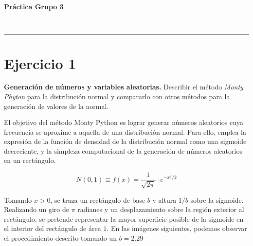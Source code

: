 \documentclass[a4paper,12pt]{article}
\begin{document}
	
	\setlength{\parindent}{0.5cm}
	\setlength{\voffset}{-2cm}
	\setlength{\hoffset}{-2cm}
	
	\begin{center}
		\begin{LARGE}
			\textbf{Práctica Grupo 3}
		\end{LARGE}
		\begin{Large}
			\\ \medskip {}
		\end{Large}
		\rule{14cm}{0.5mm}
	\end{center}
	
	
	\tableofcontents
	
\newpage
	\section*{Ejercicio 1}
	\textbf{Generación de números y variables aleatorias.} Describir el método \textit{Monty Phyton} para la distribución normal y compararlo con otros métodos para la
generación de valores de la normal.
	
	El objetivo del método Monty Python es lograr generar números aleatorios cuya frecuencia se aproxime a aquella de una distribución normal. Para ello, emplea la expresión de la función de densidad de la distribución normal como una sigmoide decreciente, y la simpleza computacional de la generación de números aleatorios en un rectángulo.
	
	$$ N(0,1) \equiv f(x) = \dfrac{1}{\sqrt{2\pi}} \cdot e^{-x^2/2} $$
	
	
	Tomando $x>0$, se traza un rectángulo de base $b$ y altura $1/b$ sobre la sigmoide. Realizando un giro de $\pi$ radianes y un desplazamiento sobre la región exterior al rectángulo, se pretende representar la mayor superficie posible de la sigmoide en el interior del rectángulo de área $1$. En las imágenes siguientes, podemos observar el procedimiento descrito tomando un $b=2.29$
	
\end{document}
